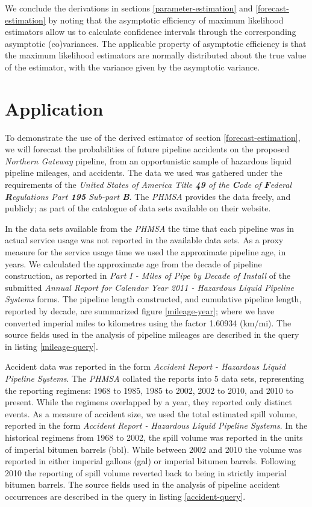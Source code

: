 \documentclass[letterpaper,10pt,oneside,final,onecolumn]{article}
\begin{document}
	We conclude the derivations in sections \ref{parameter-estimation} and \ref{forecast-estimation} by noting that the asymptotic efficiency of maximum likelihood estimators allow us to calculate confidence intervals through the corresponding asymptotic (co)variances.
	The applicable property of asymptotic efficiency is that the maximum likelihood estimators are normally distributed about the true value of the estimator, with the variance given by the asymptotic variance.

	\section{Application}\label{application}
	To demonstrate the use of the derived estimator of section \ref{forecast-estimation}, we will forecast the probabilities of future pipeline accidents on the proposed \textit{Northern Gateway} pipeline, from an opportunistic sample of hazardous liquid pipeline mileages, and accidents.
	The data we used was gathered under the requirements of the \textit{United States of America Title \textbf{49} of the \textbf{C}ode of \textbf{F}ederal \textbf{R}egulations Part \textbf{195} Sub-part \textbf{B}}.
	The \textit{PHMSA} provides the data freely, and publicly; as part of the catalogue of data sets available on their website.

	In the data sets available from the \textit{PHMSA} the time that each pipeline was in actual service usage was not reported in the available data sets.
	As a proxy measure for the service usage time we used the approximate pipeline age, in years.
	We calculated the approximate age from the decade of pipeline construction, as reported in \textit{Part I - Miles of Pipe by Decade of Install} of the submitted \textit{Annual Report for Calendar Year 2011 - Hazardous Liquid Pipeline Systems} forms.
	The pipeline length constructed, and cumulative pipeline length, reported by decade, are summarized figure \ref{mileage-year}; where we have converted imperial miles to kilometres using the factor 1.60934 (km/mi).
	The source fields used in the analysis of pipeline mileages are described in the query in listing \ref{mileage-query}.

	Accident data was reported in the form \textit{Accident Report - Hazardous Liquid Pipeline Systems}.
	The \textit{PHMSA} collated the reports into 5 data sets, representing the reporting regimens: 1968 to 1985, 1985 to 2002, 2002 to 2010, and 2010 to present.
	While the regimens overlapped by a year, they reported only distinct events. 
	As a measure of accident size, we used the total estimated spill volume, reported in the form \textit{Accident Report - Hazardous Liquid Pipeline Systems}.
	In the historical regimens from 1968 to 2002, the spill volume was reported in the units of imperial bitumen barrels (bbl).
	While between 2002 and 2010 the volume was reported in either imperial gallons (gal) or imperial bitumen barrels.
	Following 2010 the reporting of spill volume reverted back to being in strictly imperial bitumen barrels.
	The source fields used in the analysis of pipeline accident occurrences are described in the query in listing \ref{accident-query}.
\end{document}
